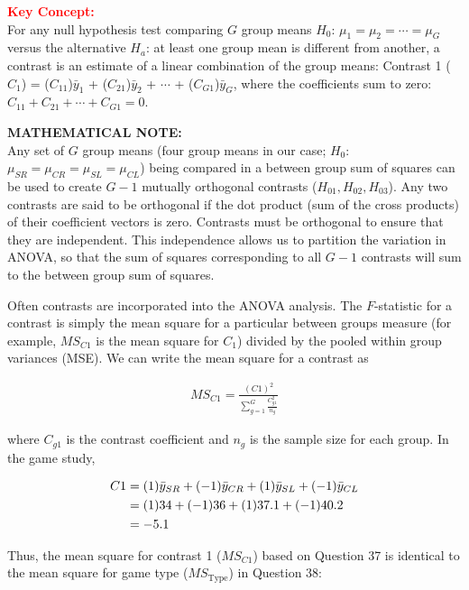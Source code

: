\documentclass[
]{report}
\begin{document}
\large

\textbf{\textcolor{red}{Key Concept:}}\\
\color{red}
For any null hypothesis test comparing \(G\) group means \(H_0\): \(\mu_1 = \mu_2 = \cdots = \mu_G\) versus the alternative \(H_a\): at least one group mean is different from another, a contrast is an estimate of a linear combination of the group means: Contrast 1 (\(C_1\)) = (\(C_{11}\))\(\bar{y}_1\) + (\(C_{21}\))\(\bar{y}_2\) + \(\cdots\) + (\(C_{G1}\))\(\bar{y}_G\), where the coefficients sum to zero: \(C_{11} + C_{21} + \cdots + C_{G1} = 0\).
\color{black}
\normalsize

\large

\textbf{MATHEMATICAL NOTE:}\\
Any set of \(G\) group means (four group means in our case; \(H_0\): \(\mu_{SR} = \mu_{CR} = \mu_{SL} = \mu_{CL}\)) being compared in a between group sum of squares can be used to create \(G-1\) mutually orthogonal contrasts (\(H_{01}, H_{02}, H_{03}\)). Any two contrasts are said to be orthogonal if the dot product (sum of the cross products) of their coefficient vectors is zero. Contrasts must be orthogonal to ensure that they are independent. This independence allows us to partition the variation in ANOVA, so that the sum of squares corresponding to all \(G-1\) contrasts will sum to the between group sum of squares.
\normalsize

Often contrasts are incorporated into the ANOVA analysis. The \(F\)-statistic for a contrast is simply the mean square for a particular between groups measure (for example, \(MS_{C1}\) is the mean square for \(C_1\)) divided by the pooled within group variances (MSE). We can write the mean square for a contrast as

\begin{align}\label{4.15}
MS_{C1} = \frac{(C1)^2}{\sum_{g=1}^{G} \frac{C_{g1}^2}{n_g}}
\tag{4.15}
\end{align}

where \(C_{g1}\) is the contrast coefficient and \(n_g\) is the sample size for each group. In the game study,

\begin{align}
C1 &= (1)\bar{y}_{SR} + (-1)\bar{y}_{CR} + (1)\bar{y}_{SL} + (-1)\bar{y}_{CL} \notag \\
   &= (1)34 + (-1)36 + (1)37.1 + (-1)40.2 \notag \\
   &= -5.1 \notag
\end{align}

Thus, the mean square for contrast 1 (\(MS_{C1}\)) based on Question 37 is identical to the mean square for game type (\(MS_{\text{Type}}\)) in Question 38:
\end{document}
